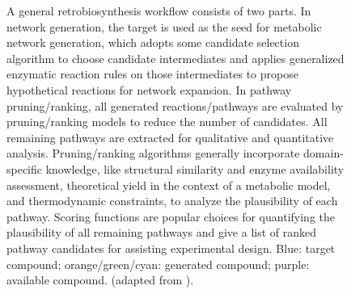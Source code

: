 \documentclass{article}
\begin{document}
\begin{figure}
\centering
    
    \caption{A general retrobiosynthesis workflow consists of two parts. In network generation, the target is used as the seed for metabolic network generation, which adopts some candidate selection algorithm to choose candidate intermediates and applies generalized enzymatic reaction rules on those intermediates to propose hypothetical reactions for network expansion.
    In pathway pruning/ranking, all generated reactions/pathways are evaluated by pruning/ranking models to reduce the number of candidates.
    All remaining pathways are extracted for qualitative and quantitative analysis. Pruning/ranking algorithms generally incorporate domain-specific knowledge, like structural similarity and enzyme availability assessment, theoretical yield in the context of a metabolic model, and thermodynamic constraints, to analyze the plausibility of each pathway. Scoring functions are popular choices for quantifying the plausibility of all remaining pathways and give a list of ranked pathway candidates for assisting experimental design. Blue: target compound; orange/green/cyan: generated compound; purple: available compound. (adapted from \citep{yim2011metabolic, hadadi2015design}).}
    \label{fig:retro_workflow}
\end{figure}
\end{document}
